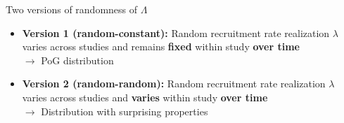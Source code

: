 \documentclass[english]{beamer}\usepackage[]{graphicx}\usepackage[]{xcolor}
\begin{document}
% 





\begin{frame}{Two versions of randomness of $\Lambda$}
\begin{itemize}
\item \textbf{Version 1 (random-constant):} Random recruitment rate realization $\lambda$ varies across studies and remains \textbf{fixed} within study \textbf{over time} \\ $\rightarrow$ PoG distribution
\item \textbf{Version 2 (random-random):} Random recruitment rate realization $\lambda$ varies across studies and \textbf{varies} within study \textbf{over time} \\ $\rightarrow$ Distribution with surprising properties
\end{itemize}
\end{frame}
\end{document}
